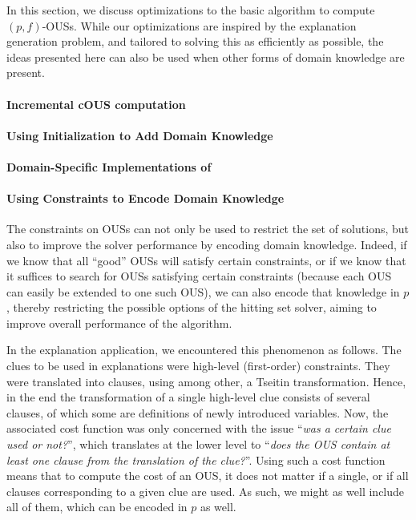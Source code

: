 In this section, we discuss optimizations to the basic algorithm to compute $(p,f)$-OUSs. 
While our optimizations are inspired by the explanation generation problem, and tailored to solving this as efficiently as possible, the ideas presented here can also be used when other forms of domain knowledge are present.  


\paragraph{Incremental cOUS computation}


\paragraph{Using Initialization to Add Domain Knowledge}



\paragraph{Domain-Specific Implementations of \grow}


\paragraph{Using Constraints to Encode Domain Knowledge}
The constraints on OUSs can not only be used to restrict the set of solutions, but also to improve the solver performance by encoding domain knowledge.
Indeed, if we know that all ``good'' OUSs will satisfy certain constraints, or if we know that it suffices to search for OUSs satisfying certain constraints (because each OUS can easily be extended to one such OUS),  we can also encode that knowledge in $p$, thereby restricting the possible options of the hitting set solver, aiming to improve overall performance of the algorithm. 

In the explanation application, we encountered this phenomenon as follows. 
The clues to be used in explanations were high-level (first-order) constraints. They were translated into clauses, using among other, a Tseitin transformation.
Hence, in the end the transformation of a single high-level clue consists of several clauses, of which some are definitions of newly introduced variables. 
Now, the associated cost function was only concerned with the issue ``\emph{was a certain clue used or not?}'', which translates at the lower level to ``\emph{does the OUS contain at least one clause from the translation of the clue?}''.
Using such a cost function means that to compute the cost of an OUS, it does not matter if a single, or if all clauses corresponding to a given clue are used. As such, we might as well include all of them, which can be encoded in $p$ as well. 

